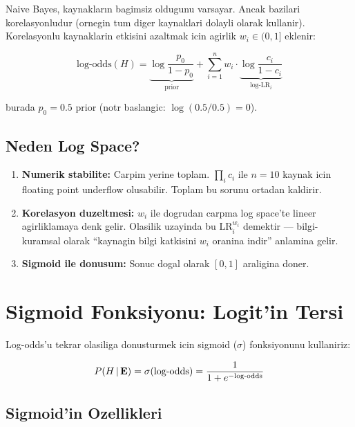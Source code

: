 Naive Bayes, kaynakların bagimsiz oldugunu varsayar. Ancak bazilari korelasyonludur (ornegin  tum diger kaynaklari dolayli olarak kullanir). Korelasyonlu kaynaklarin etkisini azaltmak icin agirlik $w_i \in (0, 1]$ eklenir:

\begin{equation}
\boxed{
\text{log-odds}(H) = \underbrace{\log\frac{p_0}{1 - p_0}}_{\text{prior}} + \sum_{i=1}^{n} w_i \cdot \underbrace{\log\frac{c_i}{1 - c_i}}_{\text{log-LR}_i}
}
\label{eq:logodds-weighted}
\end{equation}

burada $p_0 = 0.5$ prior (notr baslangic: $\log(0.5/0.5) = 0$).

\subsection{Neden Log Space?}

\begin{enumerate}
\item \textbf{Numerik stabilite:} Carpim yerine toplam. $\prod_i c_i$ ile $n=10$ kaynak icin floating point underflow olusabilir. Toplam bu sorunu ortadan kaldirir.
\item \textbf{Korelasyon duzeltmesi:} $w_i$ ile dogrudan carpma log space'te lineer agirliklamaya denk gelir. Olasilik uzayinda bu $\text{LR}_i^{w_i}$ demektir --- bilgi-kuramsal olarak ``kaynagin bilgi katkisini $w_i$ oranina indir'' anlamina gelir.
\item \textbf{Sigmoid ile donusum:} Sonuc dogal olarak $[0,1]$ araligina doner.
\end{enumerate}


\section{Sigmoid Fonksiyonu: Logit'in Tersi}
\label{sec:sigmoid}

Log-odds'u tekrar olasiliga donusturmek icin sigmoid ($\sigma$) fonksiyonunu kullaniriz:

\begin{equation}
P\!\left(H \,|\, \mathbf{E}\right) = \sigma(\text{log-odds}) = \frac{1}{1 + e^{-\text{log-odds}}}
\label{eq:sigmoid-def}
\end{equation}

\subsection{Sigmoid'in Ozellikleri}

